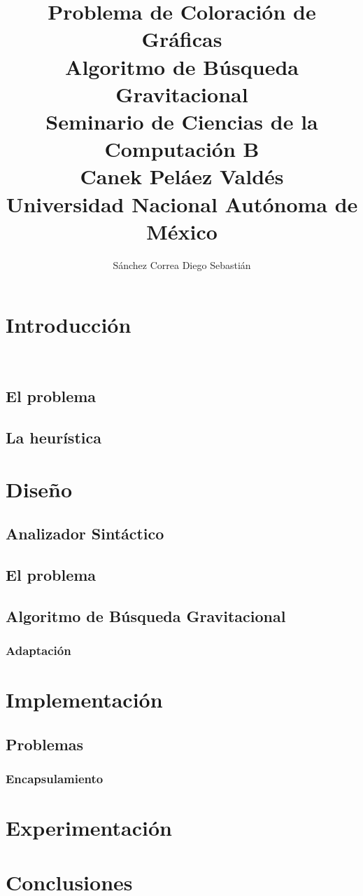 \documentclass[a4paper]{report}
\title {\textbf {\Large{Problema de Coloraci\'on de Gr\'aficas}}\protect\\
  \large{\textbf{Algoritmo de B\'usqueda Gravitacional}}\protect\\ \vspace{0.4cm}
  \normalsize{\textbf{Seminario de Ciencias de la Computaci\'on B}} \protect\\ \vspace{0.2cm}
  \normalsize{Canek Pel\'aez Vald\'es} \protect\\ \vspace{0.4cm}
  \normalsize{Universidad Nacional Aut\'onoma de M\'exico}}
\date{}
\author{\normalsize Sánchez Correa Diego Sebastián}
\begin{document}
\allowdisplaybreaks
\maketitle

\chapter{Introducci\'on}\

\section{El problema}

\section{La heur\'istica}

  \chapter{Dise\~no}

  \section{Analizador Sint\'actico}

  \section{El problema}

  \section{Algoritmo de B\'usqueda Gravitacional}

  \subsection{Adaptaci\'on}

  \chapter{Implementaci\'on}

  \section{Problemas}

  \subsection{Encapsulamiento}

  \chapter{Experimentaci\'on}

  \chapter{Conclusiones}

  {}
  
\end{document}
